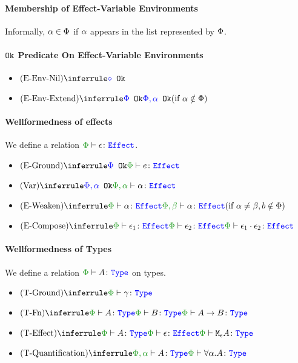 \documentclass{report}
\begin{document}
\paragraph{Membership of Effect-Variable Environments}
Informally, $\a \in \P$ if $\a$ appears in the list represented by $\P$.

\paragraph{$\okt$ Predicate On Effect-Variable Environments}
\begin{itemize}
    \item $\ntreerulez{\pnil}{\ok{\nil}}$
    \item $\condtreeruleI{\pextend}{\ok{\P}}{\ok{\P, \a}}{ \a\notin \P}$
\end{itemize}

\paragraph{Wellformedness of effects}
We define a relation $\wellformede{\P}{\e}$.

\begin{itemize}
    \item $\ntreeruleI{\eground}{\ok{\P}}{\wellformede{\P}{e}}$
    \item $\ntreeruleI{\vvar}{\ok{\P,\a}}{\wellformede{\P,\a}{\a}}$
    \item $\condtreeruleI{\eweaken}{\wellformede{\P}{\a}}{\wellformede{\P,\b}{\a}}{\a\neq\b, b\notin\P}$
    \item $\ntreeruleII{\ecompose}{\wellformede{\P}{\e_1}}{\wellformede{\P}{\e_2}}{\wellformede{\P}{\e_1\dot\e_2}}$
\end{itemize}

\paragraph{Wellformedness of Types}
We define a relation $\wellformedt{\P}{A}$ on types.

\begin{itemize}
    \item $\ntreerulez{\tground}{\wellformedt{\P}{\g}}$
    \item $\ntreeruleII{\tfun}{\wellformedt{\P}{A}}{\wellformedt{\P}{B}}{\wellformedt{\P}{\ab}}$
    \item $\ntreeruleII{\teffect}{\wellformedt{\P}{A}}{\wellformede{\P}{\e}}{\wellformedt{\P}{\mea}}$
    \item $\ntreeruleI{\tquant}{\wellformedt{\P,\a}{A}}{\wellformedt{\P}{\all{\a}{A}}}$
\end{itemize}
\end{document}
